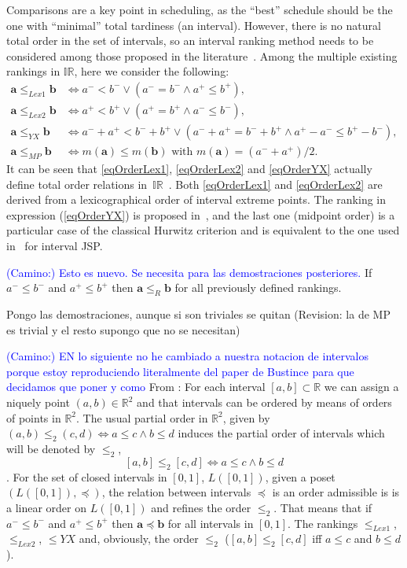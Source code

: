 \documentclass[preprint]{elsarticle}
\newcommand{\textcam}[1]{\textcolor{blue}{(Camino:) #1}}
\begin{document}
Comparisons are a key point in scheduling, as the ``best'' schedule should be the one with ``minimal'' total tardiness (an interval). However, there is no natural total order in the set of intervals, so an interval ranking method needs to be considered among those proposed in the literature~\cite{Karmakar2012}. Among the multiple existing rankings in $\mathbb{IR}$, here we consider the following:
\begin{align}
\mathbf{a} \leq_{Lex1} \mathbf{b} & \Leftrightarrow a^- < b^- \vee (a^- = b^- \wedge a^+ \leq b^+) \label{eqOrderLex1},\\
\mathbf{a} \leq_{Lex2} \mathbf{b} & \Leftrightarrow a^+ < b^+ \vee (a^+ = b^+ \wedge a^- \leq b^-)\label{eqOrderLex2},\\
\mathbf{a} \leq_{YX} \mathbf{b} & \Leftrightarrow a^-+a^+<b^-+b^+ \vee (a^-+a^+=b^-+b^+ \wedge a^+ - a^-\leq b^+-b^-)\label{eqOrderYX},\\
\mathbf{a} \leq_{MP} \mathbf{b}& \Leftrightarrow m(\mathbf{a}) \leq m(\mathbf{b}) \mbox{ with } m(\mathbf{a}) =(a^-+a^+)/2.\label{eqOrderMP}
\end{align}
It can be seen that \eqref{eqOrderLex1}, \eqref{eqOrderLex2} and \eqref{eqOrderYX} actually define total order relations in~$\mathbb{IR}$~\cite{Bustince2013}. Both \eqref{eqOrderLex1} and \eqref{eqOrderLex2} are derived from a lexicographical order of interval extreme points. The ranking in expression (\ref{eqOrderYX}) is proposed in~\cite{Xu2006}, and the last one (midpoint order) is a particular case of the classical Hurwitz criterion and is equivalent to the one used in~\cite{Lei2012c} for interval JSP. 

\textcam{Esto es nuevo. Se necesita para las demostraciones posteriores.}
If $a^- \leq b^-$ and $a^+ \leq b^+$ then $\mathbf{a} \leq_{R} \mathbf{b}$ for all previously defined rankings.

Pongo las demostraciones, aunque si son triviales se quitan (Revision: la de MP es trivial y el resto supongo que no se necesitan)

\textcam{EN lo siguiente no he cambiado a nuestra notacion de intervalos porque estoy reproduciendo literalmente del paper de Bustince para que decidamos que poner y como} From \cite{Bustince2013}: For each interval $[a,b] \subset \mathbb{R}$ we can assign a niquely point $(a,b)\in \mathbb{R}^2$ and that intervals can be ordered by means of orders of points in $\mathbb{R}^2$. The usual partial order in $\mathbb{R}^2$, given by $(a,b) \leq_2 (c,d) \iff a \leq c \land b \leq d$ induces the partial order of intervals which will be denoted by $\leq_2$, $$[a,b] \leq_2 [c,d] \iff a \leq c \land b \leq d$$. For the set of closed intervals in $[0,1]$, $L([0,1])$, given a poset $(L([0,1]),\preceq)$, the relation between intervals $\preceq$ is an order admissible is is a linear order on $L([0,1])$ and refines the order $\leq_2$. That means that if $a^- \leq b^-$ and $a^+ \leq b^+$ then $\mathbf{a} \preceq \mathbf{b}$ for all intervals in $[0,1]$. The rankings $\leq_{Lex1}$, $\leq_{Lex2}$, $\leq{YX}$ and, obviously, the order $\leq_2$ ($[a,b] \leq_2 [c,d]$ iff $a \leq c$ and $b \leq d$). 
\end{document}
